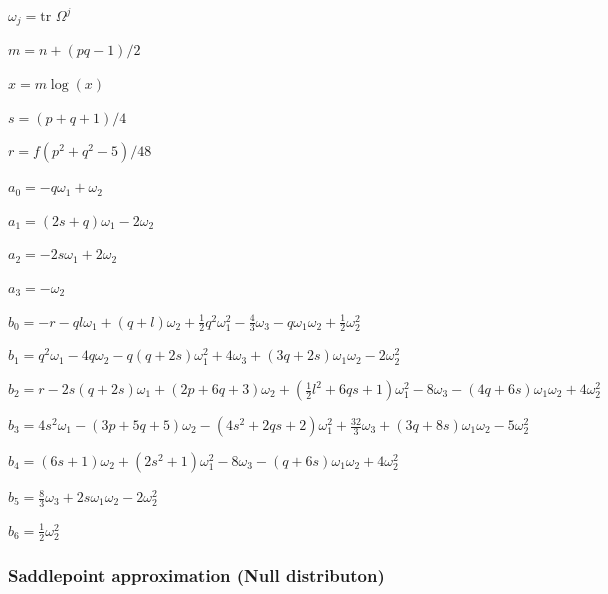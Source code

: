 $\omega_j = \text{tr } \Omega^j$


$m=n+(pq-1)/2$

$x= m \log(x)$


%

$s=(p+q+1)/4$

$r=f (p^2+q^2-5)/48$


$ a_0 = -q \omega_1+\omega_2 $

$  a_1 =(2 s+q) \omega_1 - 2 \omega_2 $

$  a_2 = -2 s \omega_1+2 \omega_2 $

$ a_3 = -\omega_2 $


\vspace{0.3cm}

$  b_0 = -r - q l \omega_1+(q+l) \omega_2 + \tfrac{1}{2} q^2 \omega_1^2 - \tfrac{4}{3} \omega_3 - q \omega_1 \omega_2 + \tfrac{1}{2} \omega_2^2 $

$  b_1 =q^2 \omega_1 - 4 q \omega_2 - q (q+2s) \omega_1^2 + 4 \omega_3+(3q+2s) \omega_1 \omega_2 - 2 \omega_2^2 $

$  b_2 =r - 2s (q+2s) \omega_1 + (2p+6q+3) \omega_2 + (\tfrac{1}{2} l^2+6qs+1) \omega_1^2 - 8 \omega_3 -(4q+6s) \omega_1 \omega_2 + 4 \omega_2^2 $

$  b_3 =4s^2 \omega_1 -(3p+5q+5) \omega_2 -(4s^2+2qs+2) \omega_1^2 + \tfrac{32}{3} \omega_3 +(3q+8s) \omega_1 \omega_2 - 5\omega_2^2 $

$  b_4 =(6s+1) \omega_2 + (2s^2+1) \omega_1^2 - 8\omega_3 -(q+6s)\omega_1\omega_2 + 4 \omega_2^2 $

$  b_5 = \tfrac{8}{3} \omega_3 + 2s\omega_1\omega_2 - 2\omega_2^2 $

$  b_6 = \tfrac{1}{2} \omega_2^2 $


\subsubsection{Saddlepoint approximation (Null distributon)}

